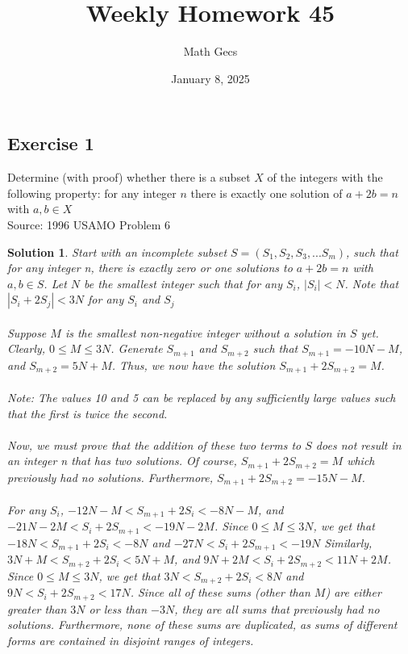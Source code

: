 \documentclass[12pt]{article}
\title{Weekly Homework 45}
\author{Math Gecs}
\date{January 8, 2025}
\newtheorem*{solution*}{Solution}
\begin{document}
\maketitle

\subsection*{Exercise 1}
Determine (with proof) whether there is a subset $X$ of the integers with the following property: for any integer $n$ there is exactly one solution of $a + 2b = n$ with $a,b \in X$\\

Source: 1996 USAMO Problem 6\\


\begin{solution*}
Start with an incomplete subset $S = (S_1, S_2, S_3, ... S_m)$, such that for any integer n, there is exactly zero or one solutions to $a + 2b = n$ with $a,b \in S$. Let $N$ be the smallest integer such that for any $S_i$, $|S_i| < N$. Note that $|S_i+2S_j| < 3N$ for any $S_i$ and $S_j$
\\ \\
Suppose $M$ is the smallest non-negative integer without a solution in $S$ yet. Clearly, $0 \le M \le 3N$. Generate $S_{m+1}$ and $S_{m+2}$ such that $S_{m+1} = -10N - M$, and $S_{m+2} = 5N + M$. Thus, we now have the solution $S_{m+1}+2S_{m+2} = M$.
\\ \\
Note: The values 10 and 5 can be replaced by any sufficiently large values such that the first is twice the second.
\\ \\
Now, we must prove that the addition of these two terms to $S$ does not result in an integer n that has two solutions. Of course, $S_{m+1} + 2S_{m+2} = M$ which previously had no solutions. Furthermore, $S_{m+1} + 2S_{m+2} = -15N - M$.
\\ \\
For any $S_i$, $-12N - M < S_{m+1}+2S_i < -8N-M$, and $-21N - 2M < S_i+2S_{m+1} < -19N - 2M$.
Since $0 \le M \le 3N$, we get that $-18N < S_{m+1}+2S_i < -8N$ and $-27N < S_i+2S_{m+1} < -19N$
Similarly, $3N + M < S_{m+2}+2S_i < 5N + M$, and $9N+2M < S_i+2S_{m+2} < 11N+2M$.
Since $0 \le M \le 3N$, we get that $3N < S_{m+2}+2S_i < 8N$ and $9N < S_i+2S_{m+2} < 17N$.
Since all of these sums (other than $M$) are either greater than $3N$ or less than $-3N$, they are all sums that previously had no solutions. Furthermore, none of these sums are duplicated, as sums of different forms are contained in disjoint ranges of integers.

\end{solution*}
\end{document}
